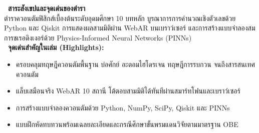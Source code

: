 \documentclass[11pt]{article}
\begin{document}
\vspace*{0.35cm}
\begin{center}
    \begin{tcolorbox}[
        enhanced,
        colback=black!60,
        colframe=accentCol,
        boxrule=1.2pt,
        arc=5pt,
        width=13.6cm,
        top=7pt, bottom=7pt, left=10pt, right=10pt
    ]
        \raggedright
        {\fontsize{11.5pt}{14pt}\selectfont\bfseries\color{accentCol} \textbullet\ สาระสังเขปและจุดเด่นของตำรา} \\[4pt]
        {\fontsize{9pt}{13.5pt}\selectfont\color{white} ตำราควอนตัมฟิสิกส์เบื้องต้นระดับอุดมศึกษา 10 บทหลัก บูรณาการการคำนวณเชิงตัวเลขด้วย Python และ Qiskit การแสดงผลสามมิติผ่าน WebAR บนเบราว์เซอร์ และการสร้างแบบจำลองสมการชเรอดิงเงอร์ด้วย Physics-Informed Neural Networks (PINNs)} \\[6pt]
        
        {\fontsize{9.5pt}{12.5pt}\selectfont\bfseries\color{accentCol} \textbullet\ จุดเด่นสำคัญในเล่ม (Highlights):} \\[3pt]
        \begin{itemize}[leftmargin=0.7cm, itemsep=1.5pt]
            \color{white!95}
            \fontsize{8.5pt}{12pt}\selectfont
            \item ครอบคลุมทฤษฎีควอนตัมพื้นฐาน บ่อศักย์ อะตอมไฮโดรเจน ทฤษฎีการรบกวน จนถึงสารสนเทศควอนตัม
            \item แล็บเสมือนจริง WebAR 10 สถานี โต้ตอบสามมิติได้ทันทีผ่านสมาร์ทโฟนและเบราว์เซอร์
            \item การสร้างแบบจำลองควอนตัมด้วย Python, NumPy, SciPy, Qiskit และ PINNs
            \item แบบฝึกหัดทบทวนพร้อมเฉลยละเอียดและกรณีศึกษาขั้นพรมแดนวิจัยตามมาตรฐาน OBE
        \end{itemize}
    \end{tcolorbox}
    
    \vspace{0.25cm}
    

\end{center}
\end{document}
